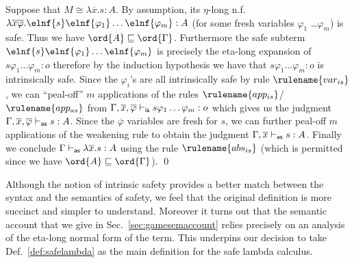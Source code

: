 Suppose that $M \cong \lambda \overline{x} . s : A$.
By assumption, its  $\eta$-long n.f.\ 
$\lambda \overline{x} \overline{\varphi} . \elnf{s} \elnf{\varphi_1} \ldots \elnf{\varphi_m}: A$ (for
some fresh variables $\varphi_1$ \ldots $\varphi_m$) is safe.
Thus we have $\ord{A}\sqsubseteq\ord{\Gamma}$.
Furthermore the safe subterm $\elnf{s} \elnf{\varphi_1} \ldots \elnf{\varphi_m}$ is precisely the eta-long expansion of $s\varphi_1 \ldots \varphi_m : o$ therefore by the induction hypothesis we have that $s \varphi_1 \ldots \varphi_m :o$ is intrinsically safe.
Since the $\varphi_i$'s are all intrinsically safe by rule $\rulename{var_{is}}$, we can ``peal-off'' $m$ applications of the rules
$\rulename{app_{is}}$/$\rulename{app_{as}}$ from $\Gamma, \overline{x}, \overline{\varphi} \vdash_{\sf is} s \varphi_1 \ldots \varphi_m :o$ which gives us the judgment $\Gamma, \overline{x}, \overline{\varphi} \vdash_{\sf as} s : A$. 
Since the $\overline{\varphi}$ variables are fresh for $s$, we can further peal-off $m$ applications of the weakening rule to obtain the judgment $\Gamma, \overline{x} \vdash_{\sf as} s : A$. Finally we conclude
$\Gamma \vdash_{\sf as} \lambda \overline{x} . s : A$ using the rule 
$\rulename{abs_{is}}$ (which is permitted since we have $\ord{A}\sqsubseteq\ord{\Gamma}$).
\qed
\smallskip

 

\begin{remark}
  Although the notion of intrinsic safety provides a better match between the syntax and the semantics of safety, we feel that the original definition is more succinct and simpler to understand. Moreover it turns out that the semantic account that we give in Sec.~\ref{sec:gamesemaccount} relies precisely on an analysis of the eta-long normal form of the term. This underpins our decision to take Def.~\ref{def:safelambda} as the main definition for the safe lambda calculus.
\end{remark}



